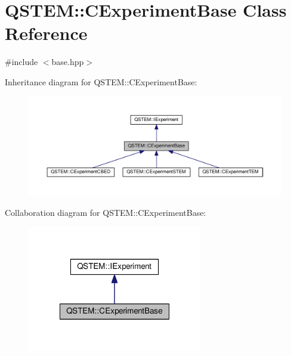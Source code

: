 \hypertarget{class_q_s_t_e_m_1_1_c_experiment_base}{\section{Q\-S\-T\-E\-M\-:\-:C\-Experiment\-Base Class Reference}
\label{class_q_s_t_e_m_1_1_c_experiment_base}
}


{\ttfamily \#include $<$base.\-hpp$>$}



Inheritance diagram for Q\-S\-T\-E\-M\-:\-:C\-Experiment\-Base\-:
\nopagebreak
\begin{figure}[H]
\begin{center}
\leavevmode
\includegraphics[width=350pt]{class_q_s_t_e_m_1_1_c_experiment_base__inherit__graph}
\end{center}
\end{figure}


Collaboration diagram for Q\-S\-T\-E\-M\-:\-:C\-Experiment\-Base\-:
\nopagebreak
\begin{figure}[H]
\begin{center}
\leavevmode
\includegraphics[width=216pt]{class_q_s_t_e_m_1_1_c_experiment_base__coll__graph}
\end{center}
\end{figure}

